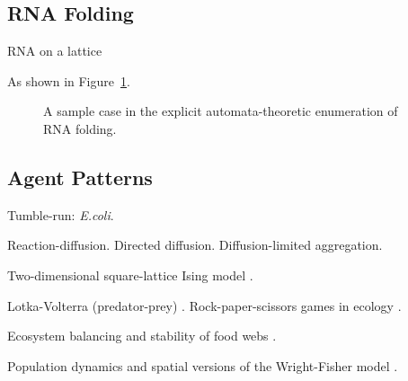 \documentclass{acm_proc_article-sp}
\begin{document}
\subsection{RNA Folding}

RNA on a lattice \cite{LeoniVanderzande2003,JostEveraers2010,ZaraPretti2007,GillespieMayneJiang2009}


As shown in Figure~\ref{fig:rna}.

\begin{figure}
\caption{
\label{fig:rna}
A sample case in the explicit automata-theoretic enumeration of RNA folding.
}
\end{figure}

\subsection{Agent Patterns}

Tumble-run: {\em E.coli}.
\cite{RosserEtAl2013}


Reaction-diffusion.
Directed diffusion.
Diffusion-limited aggregation.
\cite{DLA}

Two-dimensional square-lattice Ising model \cite{Onsager1944}.

Lotka-Volterra (predator-prey) \cite{LotkaVolterra,SpatialLotkaVolterra}.
Rock-paper-scissors games in ecology \cite{Tainaka2000}.

Ecosystem balancing and stability of food webs \cite{quince2005topological}.

Population dynamics and spatial versions of the Wright-Fisher model \cite{MathiesonMcVean2013}.
\end{document}
